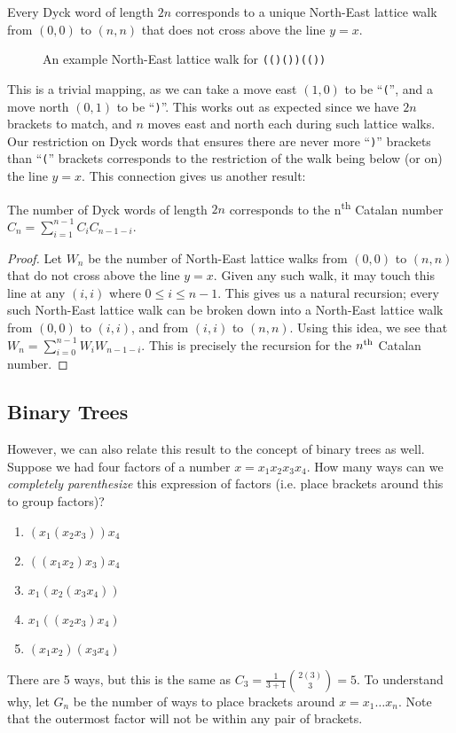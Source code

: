 \begin{theorem}
    Every Dyck word of length $2n$ corresponds to a unique North-East lattice walk from $(0, 0)$ to $(n, n)$ that does not cross above the line $y = x$. 
\end{theorem}

\begin{figure}[h]
    \centering
    
    \caption{An example North-East lattice walk for \texttt{(()())(())}}
    \label{fig:dyck_path}
\end{figure}

This is a trivial mapping, as we can take a move east $(1,0)$ to be ``\texttt{(}'', and a move north $(0,1)$ to be ``\texttt{)}''. This works out as expected since we have $2n$ brackets to match, and $n$ moves east and north each during such lattice walks. Our restriction on Dyck words that ensures there are never more ``\texttt{)}'' brackets than ``\texttt{(}'' brackets corresponds to the restriction of the walk being below (or on) the line $y = x$. This connection gives us another result:

\begin{theorem}
    The number of Dyck words of length $2n$ corresponds to the n\textsuperscript{th} Catalan number $C_{n}=\sum_{i=1}^{n-1}C_{i}C_{n-1-i}$.
\end{theorem}
\begin{proof}
    Let $W_{n}$ be the number of North-East lattice walks from $(0,0)$ to $(n,n)$ that do not cross above the line $y = x$. Given any such walk, it may touch this line at any $(i, i)$ where $0 \leq i \leq n-1$. This gives us a natural recursion; every such North-East lattice walk can be broken down into a North-East lattice walk from $(0, 0)$ to $(i, i)$, and from $(i, i)$ to $(n, n)$. Using this idea, we see that $W_{n}=\sum_{i=0}^{n-1}W_{i}W_{n-1-i}$. This is precisely the recursion for the $n\textsuperscript{th}$ Catalan number.
\end{proof}

\subsection{Binary Trees}
However, we can also relate this result to the concept of binary trees as well. Suppose we had four factors of a number $x = x_{1}x_{2}x_{3}x_{4}$. How many ways can we \textit{completely parenthesize} this expression of factors (i.e. place brackets around this to group factors)?
\begin{enumerate}
    \item $(x_{1}(x_{2}x_{3}))x_{4}$
    \item $((x_{1}x_{2})x_{3})x_{4}$
    \item $x_{1}(x_{2}(x_{3}x_{4}))$
    \item $x_{1}((x_{2}x_{3})x_{4})$
    \item $(x_{1}x_{2})(x_{3}x_{4})$
\end{enumerate}
There are 5 ways, but this is the same as $C_3 = \frac{1}{3+1} {2(3) \choose 3} = 5$. To understand why, let $G_{n}$ be the number of ways to place brackets around $x = x_{1}\dots x_{n}$. Note that the outermost factor will not be within any pair of brackets.

